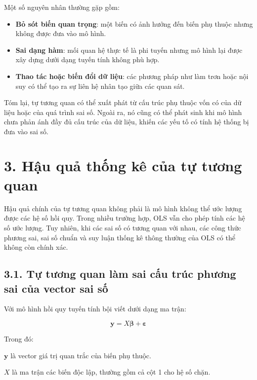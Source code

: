 \documentclass[12pt,a4paper]{article}
\begin{document}
Một số nguyên nhân thường gặp gồm:

\begin{itemize}
    \item \textbf{Bỏ sót biến quan trọng}: một biến có ảnh hưởng đến biến phụ thuộc nhưng không được đưa vào mô hình.
    
    \item \textbf{Sai dạng hàm}: mối quan hệ thực tế là phi tuyến nhưng mô hình lại được xây dựng dưới dạng tuyến tính không phù hợp.
    
    \item \textbf{Thao tác hoặc biến đổi dữ liệu}: các phương pháp như làm trơn hoặc nội suy có thể tạo ra sự liên hệ nhân tạo giữa các quan sát.
\end{itemize}

Tóm lại, tự tương quan có thể xuất phát từ cấu trúc phụ thuộc vốn có của dữ liệu hoặc của quá trình sai số. Ngoài ra, nó cũng có thể phát sinh khi mô hình chưa phản ánh đầy đủ cấu trúc của dữ liệu, khiến các yếu tố có tính hệ thống bị đưa vào sai số.


\section{3. Hậu quả thống kê của tự tương
quan}\label{hux1eadu-quux1ea3-thux1ed1ng-kuxea-cux1ee7a-tux1ef1-tux1b0ux1a1ng-quan}

Hậu quả chính của tự tương quan không phải là mô hình không thể ước lượng được các hệ số hồi quy. Trong nhiều trường hợp, OLS vẫn cho phép tính các hệ số ước lượng. Tuy nhiên, khi các sai số có tương quan với nhau, các công thức phương sai, sai số chuẩn và suy luận thống kê thông thường của OLS có thể không còn chính xác.

\subsection{3.1. Tự tương quan làm sai cấu trúc phương sai của vector
sai
số}\label{tux1ef1-tux1b0ux1a1ng-quan-luxe0m-sai-cux1ea5u-truxfac-phux1b0ux1a1ng-sai-cux1ee7a-vector-sai-sux1ed1}

Với mô hình hồi quy tuyến tính bội viết dưới dạng ma trận:

\[
\mathbf{y} = X\boldsymbol{\beta} + \boldsymbol{\varepsilon}
\]

Trong đó:

\(\mathbf{y}\) là vector giá trị quan trắc của biến phụ thuộc.

\(X\) là ma trận các biến độc lập, thường gồm cả cột 1 cho hệ số chặn.
\end{document}
